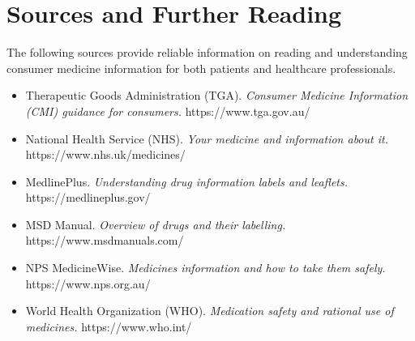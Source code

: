 \section*{Sources and Further Reading}
The following sources provide reliable information on reading and understanding consumer medicine information for both patients and healthcare professionals.
\begin{itemize}
    \item Therapeutic Goods Administration (TGA). \textit{Consumer Medicine Information (CMI) guidance for consumers.} https://www.tga.gov.au/
    \item National Health Service (NHS). \textit{Your medicine and information about it.} https://www.nhs.uk/medicines/
    \item MedlinePlus. \textit{Understanding drug information labels and leaflets.} https://medlineplus.gov/
    \item MSD Manual. \textit{Overview of drugs and their labelling.} https://www.msdmanuals.com/
    \item NPS MedicineWise. \textit{Medicines information and how to take them safely.} https://www.nps.org.au/
    \item World Health Organization (WHO). \textit{Medication safety and rational use of medicines.} https://www.who.int/
\end{itemize}
